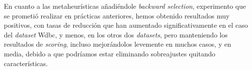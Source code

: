 \documentclass[a4paper,11pt]{article}
\begin{document}
  En cuanto a las metaheurísticas añadiéndole \textit{backward selection}, experimento que se prometió realizar en prácticas
  anteriores, hemos obtenido resultados muy positivos, con tasas de reducción que han aumentado significativamente en el caso
  del \textit{dataset} Wdbc, y menos, en los otros dos \textit{datasets}, pero manteniendo los resultados de \textit{scoring},
  incluso mejorándolos levemente en muchos casos, y en media, debido a que podríamos estar eliminando sobreajustes quitando
  características.
  
\end{document}
